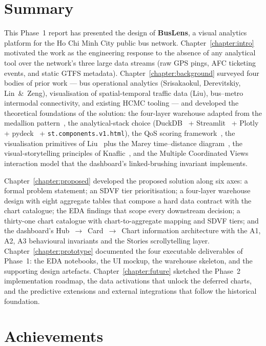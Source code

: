 \section{Summary}
\label{sec:conclusion:summary}

This Phase~1 report has presented the design of \textbf{BusLens},
a visual analytics platform for the Ho Chi Minh City public bus
network. Chapter~\ref{chapter:intro} motivated the work as the
engineering response to the absence of any analytical tool over
the network's three large data streams (raw GPS pings, AFC
ticketing events, and static GTFS metadata).
Chapter~\ref{chapter:background} surveyed four bodies of prior
work --- bus operational analytics (Srisakaokul, Derevitskiy,
Lin~\&~Zeng), visualisation of spatial-temporal traffic data
(Liu), bus--metro intermodal connectivity, and existing HCMC
tooling --- and developed the theoretical foundations of the
solution: the four-layer warehouse adapted from the medallion
pattern~\cite{databricksMedallion}, the analytical-stack choice
(DuckDB~\cite{duckdb} + Streamlit~\cite{streamlit} +
Plotly~\cite{plotly} + pydeck~\cite{pydeck} +
\texttt{st.components.v1.html}), the QoS scoring
framework~\cite{srisakaokul2023}, the visualisation primitives
of Liu~\cite{liu2022} plus the Marey time--distance
diagram~\cite{linzeng2014}, the visual-storytelling principles
of Knaflic~\cite{knaflic2015}, and the Multiple Coordinated
Views interaction model that the dashboard's linked-brushing
invariant implements.

Chapter~\ref{chapter:proposed} developed the proposed solution
along six axes: a formal problem statement; an SDVF tier
prioritisation; a four-layer warehouse design with eight
aggregate tables that compose a hard data contract with the
chart catalogue; the EDA findings that scope every downstream
decision; a thirty-one chart catalogue with chart-to-aggregate
mapping and SDVF tiers; and the dashboard's
Hub~$\rightarrow$~Card~$\rightarrow$~Chart information
architecture with the A1, A2, A3 behavioural invariants and the
Stories scrollytelling layer.
Chapter~\ref{chapter:prototype} documented the four executable
deliverables of Phase~1: the EDA notebooks, the UI mockup, the
warehouse skeleton, and the supporting design artefacts.
Chapter~\ref{chapter:future} sketched the Phase~2
implementation roadmap, the data activations that unlock the
deferred charts, and the predictive extensions and external
integrations that follow the historical foundation.

\section{Achievements}
\label{sec:conclusion:achievements}

